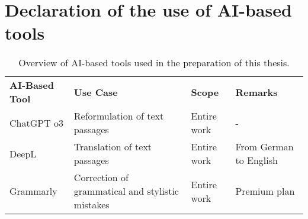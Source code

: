 \chapter{Declaration of the use of AI-based tools}\label{chapter:AIdecl}
\begin{table}[htbp]
\centering

\renewcommand{\arraystretch}{1.3} %


\small %
\begin{tabularx}{\textwidth}{lXlX}
\rowcolor{darkgray}
\textbf{AI-Based Tool} & \textbf{Use Case} & \textbf{Scope} & \textbf{Remarks} \\

ChatGPT o3 & Reformulation of text passages & 
Entire work & - \\

DeepL & Translation of text passages &
Entire work & From German to English \\

Grammarly & Correction of grammatical and stylistic mistakes &
Entire work & Premium plan \\
\end{tabularx}
\caption{Overview of AI-based tools used in the preparation of this thesis.}
\label{tab:ai-tools}
\end{table}